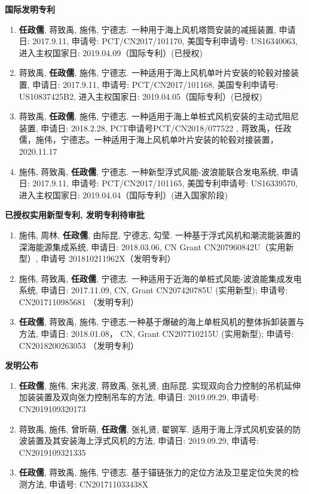 \documentclass[10pt]{ctexart}
\begin{document}
{    \textbf{国际发明专利}
    \begin{enumerate}
    \item \textbf{任政儒}, 蒋致禹, 施伟, 宁德志. 一种用于海上风机塔筒安装的减摇装置, 申请日: 2017.9.11, 申请号: PCT/CN2017/101170, 美国专利申请号: US16340063, 进入主权国家日: 2019.04.09（国际专利）(已授权) 
    \item 蒋致禹, \textbf{任政儒}, 施伟, 宁德志. 一种适用于海上风机单叶片安装的轮毂对接装置, 申请日: 2017.9.11, 申请号: PCT/CN2017/101168, 美国专利申请号: US10837425B2, 进入主权国家日: 2019.04.05（国际专利）(已授权) 
    \item 蒋致禹, \textbf{任政儒}, 施伟, 宁德志. 一种适用于海上单桩式风机安装的主动式阻尼装置, 申请日: 2018.2.28, PCT申请号PCT/CN2018/077522 , 
    蒋致禹，任政儒，施伟，宁德志。一种适用于海上风机单叶片安装的轮毂对接装置，2020.11.17
    \item 施伟, 蒋致禹, \textbf{任政儒}, 宁德志. 一种新型浮式风能-波浪能联合发电系统, 申请日: 2017.9.11, 申请号: PCT/CN2017/101165, 美国专利申请号: US16339570, 进入主权国家日: 2019.04.04（国际专利）(进入国家阶段)
    \end{enumerate}
    \vspace*{0.5em}
    
    \textbf{已授权实用新型专利, 发明专利待审批}
    \begin{enumerate}
    \item 施伟, 周林, \textbf{任政儒}, 由际昆, 宁德志, 勾莹. 一种基于浮式风机和潮流能装置的深海能源集成系统, 申请日: 2018.03.06, CN Grant CN207960842U（实用新型）, 申请号 201810211962X（发明专利） 
    \item 施伟, 蒋致禹, \textbf{任政儒}, 宁德志. 一种适用于近海的单桩式风能-波浪能集成发电系统, 申请日: 2017.11.09, CN, Grant CN207420785U (实用新型); 申请号: CN2017110985681 （发明专利）
    \item \textbf{任政儒}, 蒋致禹, 施伟, 宁德志.一种基于爆破的海上单桩风机的整体拆卸装置与方法, 申请日: 2018.01.08， CN, Grant CN207710215U (实用新型); 申请号: CN2018200263053 （发明专利）
    \end{enumerate}
    \vspace*{0.5em}
    
    \textbf{发明公布}
    \begin{enumerate}
    \item \textbf{任政儒}, 施伟, 宋兆波, 蒋致禹, 张礼贤, 由际昆. 实现双向合力控制的吊机延伸加装装置及双向张力控制吊车的方法, 申请日: 2019.09.29, 申请号: CN2019109320173
    \item 蒋致禹, 施伟, 曾昕萌, \textbf{任政儒}, 张礼贤, 翟钢军. 适用于海上浮式风机安装的防波装置及其安装海上浮式风机的方法, 申请日: 2019.09.29, 申请号: CN2019109321335 
    \item \textbf{任政儒}, 蒋致禹, 施伟, 宁德志. 基于锚链张力的定位方法及卫星定位失灵的检测方法, 申请号: CN201711033438X
    \end{enumerate}
    \vspace*{0.5em}
}\fi
\end{document}
